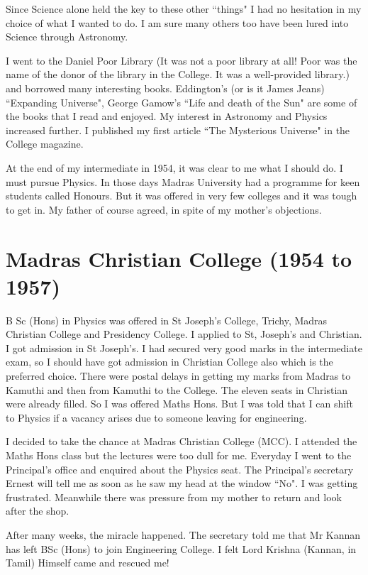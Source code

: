 Since Science alone held the key to these other ``things" I had no 
hesitation in my choice of what I wanted to do. I am sure many others 
too have been lured into Science through Astronomy.

I went to the Daniel Poor Library (It was not a poor library at all! 
Poor was the name of the donor of the library in the College. It was a 
well-provided library.) and borrowed many interesting books. Eddington's 
(or is it James Jeans) ``Expanding Universe", George Gamow's ``Life and 
death of the Sun" are some of the books that I read and enjoyed. My 
interest in Astronomy and Physics increased further. I published my 
first article ``The Mysterious Universe" in the College magazine.

At the end of my intermediate in 1954, it was clear to me what I should 
do. I must pursue Physics. In those days Madras University had a 
programme for keen students called Honours. But it was offered in very 
few colleges and it was tough to get in. My father of course agreed, 
in spite of my mother's objections.

\section*{Madras Christian College (1954 to 1957)}

B Sc (Hons) in Physics was offered in St Joseph's College, Trichy, 
Madras Christian College and Presidency College. I applied to St, 
Joseph's and Christian. I got admission in St Joseph's. I had secured 
very good marks in the intermediate exam, so I should have got admission 
in Christian College also which is the preferred choice.  There were 
postal delays in getting my marks from Madras to Kamuthi and then from 
Kamuthi to the College. The eleven seats in Christian were already 
filled. So I was offered Maths Hons. But I was told that I can shift to 
Physics if a vacancy arises due to someone leaving for engineering.

I decided to take the chance at Madras Christian College (MCC). I 
attended the Maths Hons class but the lectures were too dull for me. 
Everyday I went to the Principal's office and enquired about the Physics 
seat. The Principal's secretary Ernest will tell me as soon as he saw my 
head at the window ``No". I was getting frustrated. Meanwhile there was 
pressure from my mother to return and look after the shop.

After many weeks, the miracle happened. The secretary told me that Mr 
Kannan has left BSc (Hons) to join Engineering College. I felt Lord 
Krishna (Kannan, in Tamil) Himself came and rescued me!

